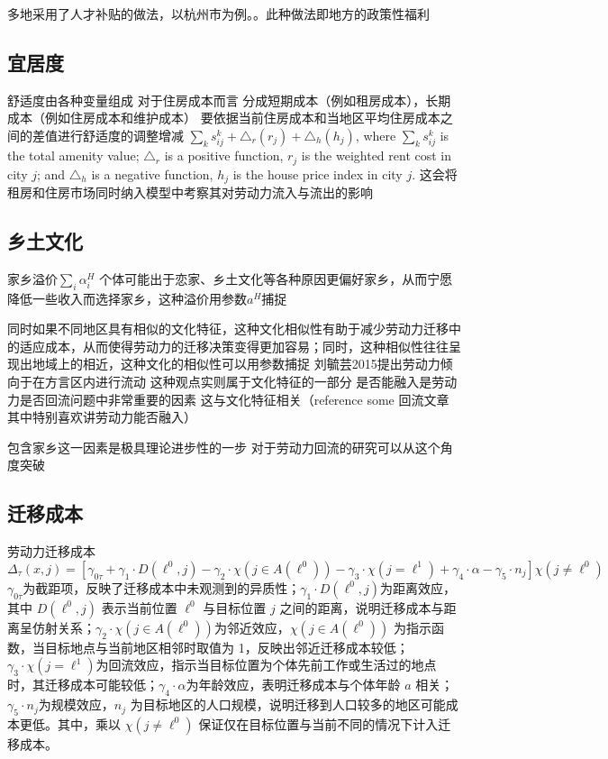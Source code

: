 \documentclass[a4paper,12pt]{article}
\begin{document}
多地采用了人才补贴的做法，以杭州市为例。。此种做法即地方的政策性福利

\subsection{宜居度}
舒适度由各种变量组成
对于住房成本而言
分成短期成本（例如租房成本），长期成本（例如住房成本和维护成本）
要依据当前住房成本和当地区平均住房成本之间的差值进行舒适度的调整增减
$\sum\limits_{k}s^k_{ij}+\triangle_r(r_j)+\triangle_h(h_j)$, where $\sum\limits_{k}s^k_{ij}$ is the total amenity value; $\triangle_r$ is a positive function, $r_j$ is the weighted rent cost in city $j$; and $\triangle_h$ is a negative function, $h_j$ is the house price index in city $j$.
这会将租房和住房市场同时纳入模型中考察其对劳动力流入与流出的影响


\subsection{乡土文化}
家乡溢价$\sum\limits_{i}\alpha^{H}_{i}$
个体可能出于恋家、乡土文化等各种原因更偏好家乡，从而宁愿降低一些收入而选择家乡，这种溢价用参数$a^H$捕捉

同时如果不同地区具有相似的文化特征，这种文化相似性有助于减少劳动力迁移中的适应成本，从而使得劳动力的迁移决策变得更加容易；同时，这种相似性往往呈现出地域上的相近，这种文化的相似性可以用参数捕捉
刘毓芸2015提出劳动力倾向于在方言区内进行流动 这种观点实则属于文化特征的一部分
是否能融入是劳动力是否回流问题中非常重要的因素 这与文化特征相关（reference some 回流文章 其中特别喜欢讲劳动力能否融入）

包含家乡这一因素是极具理论进步性的一步 对于劳动力回流的研究可以从这个角度突破

\subsection{迁移成本}
劳动力迁移成本
\begin{equation}
  \Delta_\tau(x, j) = [\gamma_{0 \tau}+\gamma_1 \cdot D(\ell^0,j)-\gamma_2 \cdot\chi(j\in A(\ell^0))-\gamma_3 \cdot\chi(j=\ell^1)+\gamma_4 \cdot\alpha-\gamma_5 \cdot n_j]\chi(j\neq \ell^0)
\end{equation}
$\gamma_{0 \tau}$为截距项，反映了迁移成本中未观测到的异质性；$\gamma_1 \cdot D(\ell^0,j)$为距离效应，其中 $D(\ell^0, j)$ 表示当前位置 $\ell^0$ 与目标位置 $j$ 之间的距离，说明迁移成本与距离呈仿射关系；$\gamma_2 \cdot \chi(j\in A(\ell^0))$为邻近效应，$\chi(j\in A(\ell^0))$ 为指示函数，当目标地点与当前地区相邻时取值为 1，反映出邻近迁移成本较低；$\gamma_3 \cdot \chi(j=\ell^1)$为回流效应，指示当目标位置为个体先前工作或生活过的地点时，其迁移成本可能较低；$\gamma_4 \cdot \alpha$为年龄效应，表明迁移成本与个体年龄 $a$ 相关；$\gamma_5 \cdot n_j$为规模效应，$n_j$ 为目标地区的人口规模，说明迁移到人口较多的地区可能成本更低。其中，乘以 $\chi(j\neq \ell^0)$ 保证仅在目标位置与当前不同的情况下计入迁移成本。
\end{document}
